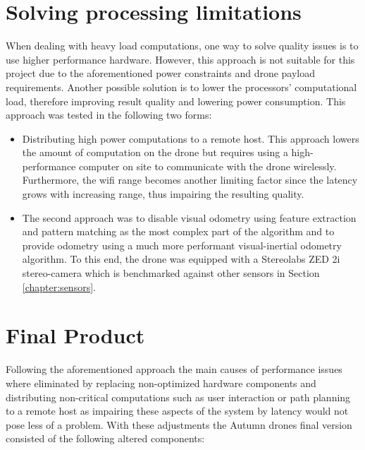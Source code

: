 \section{Solving processing limitations}
When dealing with heavy load computations, one way to solve quality issues is to use higher performance hardware. However, this approach is not suitable for this project due to the aforementioned power constraints and drone payload requirements. 
Another possible solution is to lower the processors' computational load, therefore improving result quality and lowering power consumption. 
This approach was tested in the following two forms:
\begin{itemize}
	
	\item Distributing high power computations to a remote host. This approach lowers the amount of computation on the drone but requires using a high-performance computer on site to communicate with the drone wirelessly. Furthermore, the wifi range becomes another limiting factor since the latency grows with increasing range, thus impairing the resulting quality.
	
	\item The second approach was to disable visual odometry using feature extraction and pattern matching as the most complex part of the algorithm and to provide odometry using a much more performant visual-inertial odometry algorithm. To this end, the drone was equipped with a Stereolabs ZED 2i stereo-camera which is benchmarked against other sensors in Section \ref{chapter:sensors}.%
\end{itemize}

\section{Final Product}\label{sec:finalProduct}
Following the aforementioned approach the main causes of performance issues where eliminated by replacing non-optimized hardware components and distributing non-critical computations such as user interaction or path planning to a remote host as impairing these aspects of the system by latency would not pose less of a problem. 
With these adjustments the Autumn drones final version consisted of the following altered components:


